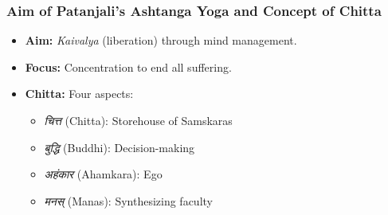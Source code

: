 

\begin{frame}[fragile]\frametitle{Aim of Patanjali’s Ashtanga Yoga and Concept of Chitta}

    \begin{itemize}
        \item \textbf{Aim:} \textit{Kaivalya} (liberation) through mind management.
        \item \textbf{Focus:} Concentration to end all suffering.
        \item \textbf{Chitta:} Four aspects:
        \begin{itemize}
            \item \textit{चित्त} (Chitta): Storehouse of Samskaras
            \item \textit{बुद्धि} (Buddhi): Decision-making
            \item \textit{अहंकार} (Ahamkara): Ego
            \item \textit{मनस्} (Manas): Synthesizing faculty
        \end{itemize}
    \end{itemize}

\end{frame}

